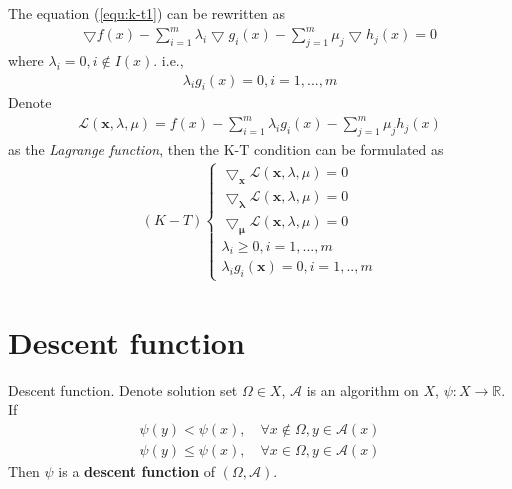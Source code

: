 \begin{remark}[K-T condition]
    The equation (\ref{equ:k-t1}) can be rewritten as
    \begin{align}
        \bigtriangledown f(x) - \sum_{i=1}^m \lambda_i
        \bigtriangledown g_i(x) - \sum_{j=1}^m \mu_j
        \bigtriangledown h_j(x) = 0
    \end{align}
    where $\lambda_i = 0, i \notin I(x)$. i.e.,
    \begin{align}
        \lambda_i g_i(x) = 0, i = 1,...,m
    \end{align}
    Denote
    \begin{align}
        \mathcal{L}(\mathbf{x}, \lambda, \mu) = 
        f(x) - \sum_{i=1}^m \lambda_i
        g_i(x) - \sum_{j=1}^m \mu_j
        h_j(x)
    \end{align}
    as the \emph{Lagrange function},
    then the K-T condition can be formulated as
    \begin{align}
        (K-T) \left\{
            \begin{array}{lllll}
                \bigtriangledown_\mathbf{x} \mathcal{L}
                (\mathbf{x}, \lambda, \mu) = 0 \\
                \bigtriangledown_\mathbf{\lambda} \mathcal{L}
                (\mathbf{x}, \lambda, \mu) = 0 \\
                \bigtriangledown_\mathbf{\mu} \mathcal{L}
                (\mathbf{x}, \lambda, \mu) = 0 \\
                \lambda_i \geq 0, i = 1,...,m \\
                \lambda_i g_i(\mathbf{x}) = 0, i = 1,..,m
            \end{array}
        \right.
        \label{sys:k-t}
    \end{align}
\end{remark}

\section{Descent function}
\par
\begin{definition}{Descent function.}
    Denote solution set $\Omega \in X$, $\mathcal{A}$ is an
    algorithm on $X$, $\psi: X \rightarrow \mathbb{R}$.
    If
    \begin{align}
        \psi(y) < \psi(x),\quad \forall x \notin \Omega, y \in \mathcal{A}(x) \\
        \psi(y) \leq \psi(x),\quad \forall x \in \Omega, y \in \mathcal{A}(x)
    \end{align}
    Then $\psi$ is a \textbf{descent function} of $(\Omega, \mathcal{A})$.
\end{definition}
